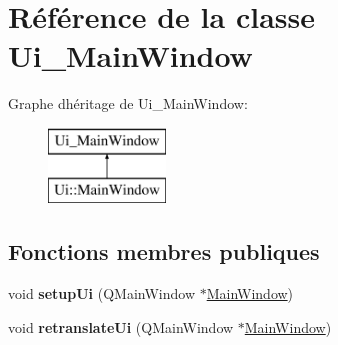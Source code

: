 \hypertarget{class_ui___main_window}{}\section{Référence de la classe Ui\+\_\+\+Main\+Window}
\label{class_ui___main_window}
Graphe d\textquotesingle{}héritage de Ui\+\_\+\+Main\+Window\+:\begin{figure}[H]
\begin{center}
\leavevmode
\includegraphics[height=2.000000cm]{class_ui___main_window}
\end{center}
\end{figure}
\subsection*{Fonctions membres publiques}
\begin{DoxyCompactItemize}
\item 
\mbox{\label{class_ui___main_window_acf4a0872c4c77d8f43a2ec66ed849b58}} 
void {\bfseries setup\+Ui} (Q\+Main\+Window $\ast$\mbox{\hyperlink{class_main_window}{Main\+Window}})
\item 
\mbox{\label{class_ui___main_window_a097dd160c3534a204904cb374412c618}} 
void {\bfseries retranslate\+Ui} (Q\+Main\+Window $\ast$\mbox{\hyperlink{class_main_window}{Main\+Window}})
\end{DoxyCompactItemize}

